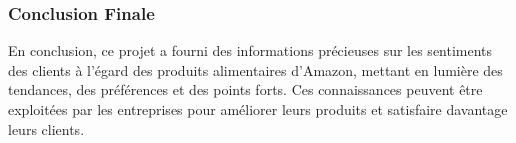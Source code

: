 \begin{frame}
    \frametitle{Conclusion Finale}
    En conclusion, ce projet a fourni des informations précieuses sur les sentiments des clients à l'égard des produits alimentaires d'Amazon, mettant en lumière des tendances, des préférences et des points forts. Ces connaissances peuvent être exploitées par les entreprises pour améliorer leurs produits et satisfaire davantage leurs clients.
\end{frame}
